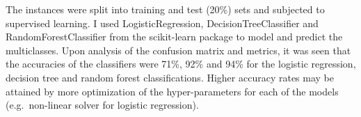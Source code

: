 \documentclass[11pt]{article}
\begin{document}
The instances were split into training and test (20\%) sets and
subjected to supervised learning. I used LogisticRegression,
DecisionTreeClassifier and RandomForestClassifier from the scikit-learn
package to model and predict the multiclasses. Upon analysis of the
confusion matrix and metrics, it was seen that the accuracies of the
classifiers were 71\%, 92\% and 94\% for the logistic regression,
decision tree and random forest classifications. Higher accuracy rates
may be attained by more optimization of the hyper-parameters for each of
the models (e.g.~non-linear solver for logistic regression).


    
    
    
    
\end{document}
